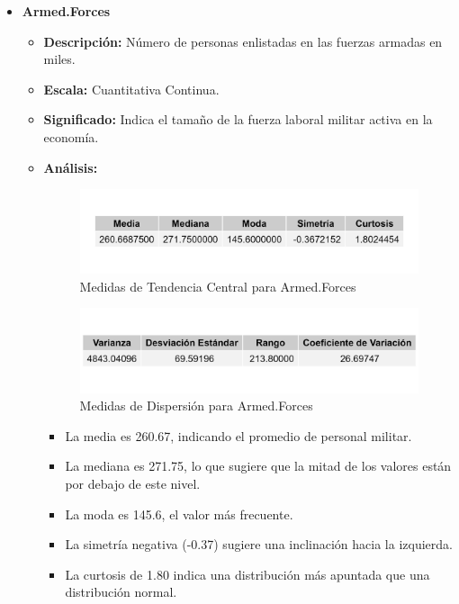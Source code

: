\documentclass{article}
\begin{document}
\begin{itemize}
    \item \textbf{Armed.Forces}
    \begin{itemize}
        \item \textbf{Descripción:} Número de personas enlistadas en las fuerzas armadas en miles.
        \item \textbf{Escala:} Cuantitativa Continua.
        \item \textbf{Significado:} Indica el tamaño de la fuerza laboral militar activa en la economía.
        \item \textbf{Análisis:} 
        \begin{figure}[H]
            \centering
            \includegraphics[width=\textwidth]{MTC/Armed.Forces_central.png}
            \caption{Medidas de Tendencia Central para Armed.Forces}
        \end{figure}
        \begin{figure}[H]
            \centering
            \includegraphics[width=\textwidth]{MTC/Armed.Forces_dispersion.png}
            \caption{Medidas de Dispersión para Armed.Forces}
        \end{figure}
            \begin{itemize}
                \item La media es 260.67, indicando el promedio de personal militar.
                \item La mediana es 271.75, lo que sugiere que la mitad de los valores están por debajo de este nivel.
                \item La moda es 145.6, el valor más frecuente.
                \item La simetría negativa (-0.37) sugiere una inclinación hacia la izquierda.
                \item La curtosis de 1.80 indica una distribución más apuntada que una distribución normal.

\end{itemize}
\end{itemize}
\end{itemize}
\end{document}
